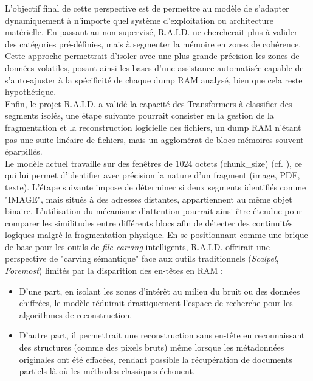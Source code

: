 \documentclass[12pt]{report}
\newcommand{\chunkSize} {$1024$}
\begin{document}
    L'objectif final de cette perspective est de permettre au modèle de s'adapter dynamiquement à n'importe quel système d'exploitation ou architecture matérielle. En passant au non supervisé, R.A.I.D. ne chercherait plus à valider des catégories pré-définies, mais à segmenter la mémoire en zones de cohérence. Cette approche permettrait d'isoler avec une plus grande précision les zones de données volatiles, posant ainsi les bases d'une assistance automatisée capable de s'auto-ajuster à la spécificité de chaque dump RAM analysé, bien que cela reste hypothétique.\\

    Enfin, le projet R.A.I.D. a validé la capacité des Transformers à classifier des segments isolés, une étape suivante pourrait consister en la gestion de la fragmentation et la reconstruction logicielle des fichiers, un dump RAM n'étant pas une suite linéaire de fichiers, mais un agglomérat de blocs mémoires souvent éparpillés.\\

    Le modèle actuel travaille sur des fenêtres de \chunkSize{} octets (chunk\_size) (cf. ), ce qui lui permet d'identifier avec précision la nature d'un fragment (image, PDF, texte). L'étape suivante impose de déterminer si deux segments identifiés comme "IMAGE", mais situés à des adresses distantes, appartiennent au même objet binaire. L'utilisation du mécanisme d'attention pourrait ainsi être étendue pour comparer les similitudes entre différents blocs afin de détecter des continuités logiques malgré la fragmentation physique.
    En se positionnant comme une brique de base pour les outils de \textit{file carving} intelligents, R.A.I.D. offrirait une perspective de "carving sémantique" face aux outils traditionnels (\textit{Scalpel}, \textit{Foremost}) limités par la disparition des en-têtes en RAM :
    \begin{itemize}
        \item  D'une part, en isolant les zones d'intérêt au milieu du bruit ou des données chiffrées, le modèle réduirait drastiquement l'espace de recherche pour les algorithmes de reconstruction.
        \item D'autre part, il permettrait une reconstruction sans en-tête en reconnaissant des structures (comme des pixels bruts) même lorsque les métadonnées originales ont été effacées, rendant possible la récupération de documents partiels là où les méthodes classiques échouent.
    \end{itemize}
\end{document}
